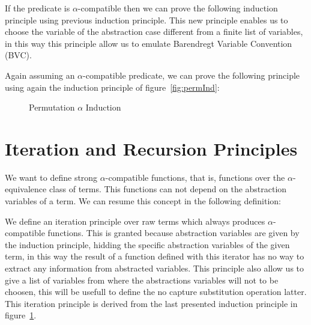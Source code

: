 \documentclass{article}
\begin{document}
 \hspace{5px}

If the predicate is $\alpha$-compatible then we can prove the following induction principle using previous  induction principle. This new principle enables us to choose the variable of the abstraction case different from a finite list of variables, in this way this principle allow us to emulate Barendregt Variable Convention (BVC).

 \hspace{5px}

Again assuming an $\alpha$-compatible predicate, we can prove the following principle using again the induction principle of figure~\ref{fig:permInd}:

\begin{figure}[!ht]
  \caption{Permutation $\alpha$ Induction}
\label{fig:permAlphaInd}
\end{figure}

\section{Iteration and Recursion Principles}
\label{sec:recursion}

We want to define strong $\alpha$-compatible functions, that is, functions over the $\alpha$-equivalence class of terms. This functions can not depend on the abstraction variables of a term. We can resume this concept in the following definition:

 \hspace{5px}

We define an iteration principle over raw terms which always produces $\alpha$-compatible functions. This is granted because abstraction variables are given by the induction principle, hidding the specific abstraction variables of the given term, in this way the result of a function defined with this iterator has no way to extract any information from abstracted variables. This principle also allow us to give a list of variables from where the abstractions variables will not to be choosen, this will be usefull to define the no capture substitution operation latter. This iteration principle is derived from the last presented induction principle in figure~\ref{fig:permAlphaInd}. 

 \hspace{5px}
\end{document}
